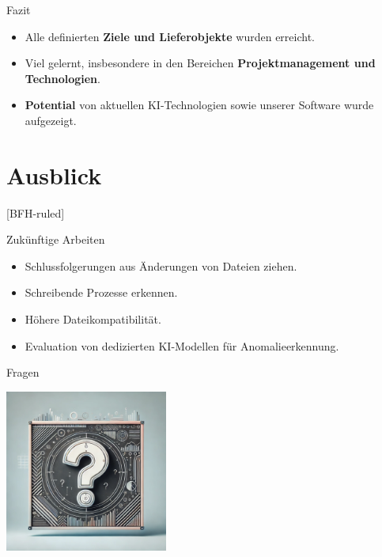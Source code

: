 \documentclass[
    ngerman,%
    authorontitle=true,
]{bfhbeamer}
\begin{document}
    \begin{frame}{Fazit}
        \begin{itemize}
            \item Alle definierten \textbf{Ziele und Lieferobjekte} wurden erreicht.
            \item Viel gelernt, insbesondere in den Bereichen \textbf{Projektmanagement und Technologien}.
            \item \textbf{Potential} von aktuellen KI-Technologien sowie unserer Software wurde aufgezeigt.
        \end{itemize}
    \end{frame}


    \section{Ausblick}\label{sec:ausblick}
    [BFH-ruled]
    \frame{\sectionpage}

    \begin{frame}{Zukünftige Arbeiten}
        \begin{itemize}
            \item Schlussfolgerungen aus Änderungen von Dateien ziehen.
            \item Schreibende Prozesse erkennen.
            \item Höhere Dateikompatibilität.
            \item Evaluation von dedizierten KI-Modellen für Anomalieerkennung.
        \end{itemize}
    \end{frame}

    \begin{frame}{Fragen}
        \begin{center}
            \includegraphics[width=0.4\textwidth]{assets/presentation/questions_frame_image}
        \end{center}
    \end{frame}
\end{document}
